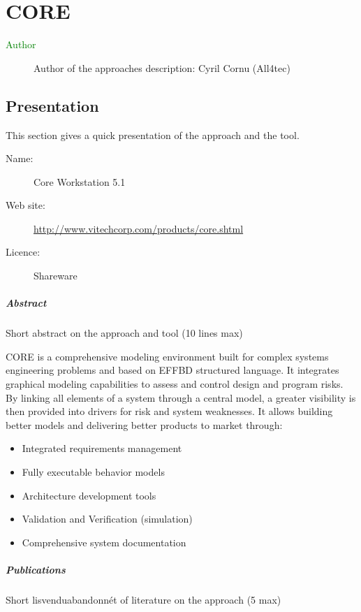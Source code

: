 \chapter{CORE}

\begin{description}
\item[\textcolor{green}{Author}] Author of the approaches description: Cyril Cornu (All4tec)
\end{description}


\section{Presentation}

This section gives a quick presentation of the approach and the tool.

\begin{description}
\item[Name:] Core Workstation 5.1
\item[Web site: ] \url{http://www.vitechcorp.com/products/core.shtml}
\item[Licence: ] Shareware
\end{description}

\paragraph{Abstract} Short abstract on the approach and tool (10 lines max)

CORE is a comprehensive modeling environment built for complex systems engineering problems and based on EFFBD structured language.
It integrates graphical modeling capabilities to assess and control design and program risks. By linking all elements of a system through a central model, a greater visibility is then provided into drivers for risk and system weaknesses. It allows building better models and delivering better products to market through:
\begin{itemize}
\item Integrated requirements management
\item  Fully executable behavior models
\item Architecture development tools
\item Validation and Verification (simulation)
\item Comprehensive system documentation
\end{itemize}



\paragraph{Publications} Short lisvenduabandonnét of literature on the approach (5 max)

